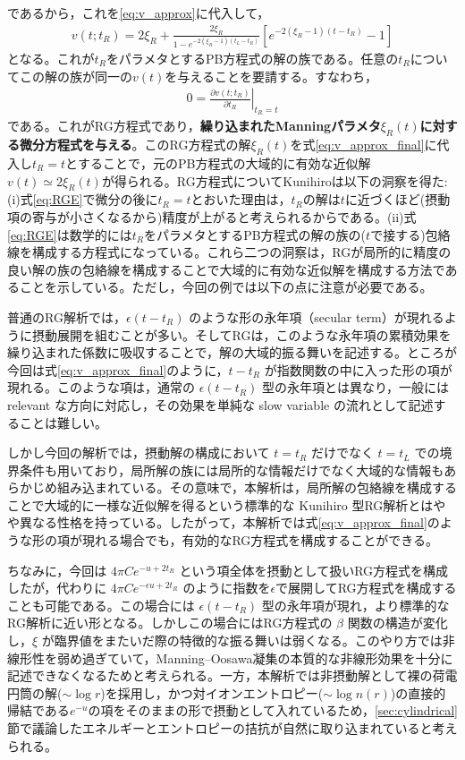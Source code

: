 \documentclass[11pt,a4paper]{ltjsarticle}
\theoremstyle{definition}
\theoremstyle{remark}
\begin{document}
であるから，これを\eqref{eq:v_approx}に代入して，
\begin{align}
  v(t;t_R) = 2\xi_R + \frac{2\xi_R}{1-e^{-2(\xi_R-1)(t_L-t_R)}} \left[ e^{-2(\xi_R-1)(t-t_R)}-1\right] \label{eq:v_approx_final}
\end{align}
となる。これが$t_R$をパラメタとするPB方程式の解の族である。任意の$t_R$についてこの解の族が同一の$v(t)$を与えることを要請する。すなわち，
\begin{align}
  0=\left.\frac{\partial v(t;t_R)}{\partial t_R}\right|_{t_R=t} \label{eq:RGE}
\end{align}
である。これがRG方程式であり，\textbf{繰り込まれたManningパラメタ$\xi_R(t)$に対する微分方程式を与える}。このRG方程式の解$\xi_R(t)$を式\eqref{eq:v_approx_final}に代入し$t_R=tとすることで$，元のPB方程式の大域的に有効な近似解$v(t)\simeq 2\xi_R(t)$が得られる。RG方程式についてKunihiroは以下の洞察を得た: (i)式\eqref{eq:RGE}で微分の後に$t_R=t$とおいた理由は，$t_R$の解は$t$に近づくほど(摂動項の寄与が小さくなるから)精度が上がると考えられるからである。(ii)式\eqref{eq:RGE}は数学的には$t_R$をパラメタとするPB方程式の解の族の($t$で接する)包絡線を構成する方程式になっている。これら二つの洞察は，RGが局所的に精度の良い解の族の包絡線を構成することで大域的に有効な近似解を構成する方法であることを示している。ただし，今回の例では以下の点に注意が必要である。
\begin{cautionbox}[title=やや進んだ注釈]
普通のRG解析では，$\epsilon (t-t_R)$ のような形の永年項（secular term）が現れるように摂動展開を組むことが多い。そしてRGは，このような永年項の累積効果を繰り込まれた係数に吸収することで，解の大域的振る舞いを記述する。ところが今回は式\eqref{eq:v_approx_final}のように，$t-t_R$ が指数関数の中に入った形の項が現れる。このような項は，通常の $\epsilon (t-t_R)$ 型の永年項とは異なり，一般には relevant な方向に対応し，その効果を単純な slow variable の流れとして記述することは難しい。

しかし今回の解析では，摂動解の構成において $t=t_R$ だけでなく $t=t_L$ での境界条件も用いており，局所解の族には局所的な情報だけでなく大域的な情報もあらかじめ組み込まれている。その意味で，本解析は，局所解の包絡線を構成することで大域的に一様な近似解を得るという標準的な Kunihiro 型RG解析とはやや異なる性格を持っている。したがって，本解析では式\eqref{eq:v_approx_final}のような形の項が現れる場合でも，有効的なRG方程式を構成することができる。

ちなみに，今回は $4\pi C e^{-u+2t_R}$ という項全体を摂動として扱いRG方程式を構成したが，代わりに $4\pi C e^{-\epsilon u+2t_R}$ のように指数を$\epsilon$で展開してRG方程式を構成することも可能である。この場合には $\epsilon (t-t_R)$ 型の永年項が現れ，より標準的なRG解析に近い形となる。しかしこの場合にはRG方程式の $\beta$ 関数の構造が変化し，$\xi$ が臨界値をまたいだ際の特徴的な振る舞いは弱くなる。このやり方では非線形性を弱め過ぎていて，Manning--Oosawa凝集の本質的な非線形効果を十分に記述できなくなるためと考えられる。一方，本解析では非摂動解として裸の荷電円筒の解($\sim \log r$)を採用し，かつ対イオンエントロピー($\sim \log n(r)$)の直接的帰結である$e^{-u}$の項をそのままの形で摂動として入れているため，\ref{sec:cylindrical}節で議論したエネルギーとエントロピーの拮抗が自然に取り込まれていると考えられる。
\end{cautionbox}
\end{document}
